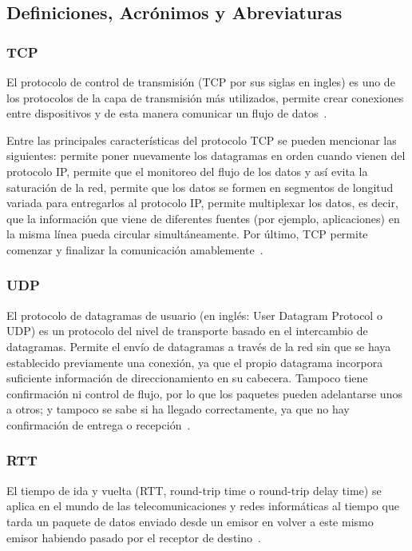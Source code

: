 \documentclass[11pt]{unc_so2}
\begin{document}
\subsection{Definiciones, Acrónimos y Abreviaturas}

\subsubsection{TCP}
El protocolo de control de transmisión (TCP por sus siglas en ingles) es uno de
los protocolos de la capa de transmisión más utilizados, permite crear
conexiones entre dispositivos y de esta manera comunicar un flujo de datos~\cite{tcp1}.

Entre las principales características del protocolo TCP se pueden mencionar las
siguientes: permite poner nuevamente los datagramas en orden cuando vienen del
protocolo IP, permite que el monitoreo del flujo de los datos y así evita la
saturación de la red, permite que los datos se formen en segmentos de longitud
variada para entregarlos al protocolo IP, permite multiplexar los datos, es
decir, que la información que viene de diferentes fuentes (por ejemplo,
aplicaciones) en la misma línea pueda circular simultáneamente. Por último, TCP
permite comenzar y finalizar la comunicación amablemente~\cite{tcp2}.

\subsubsection{UDP}
El protocolo de datagramas de usuario (en inglés: User Datagram Protocol o UDP)
es un protocolo del nivel de transporte basado en el intercambio de datagramas.
Permite el envío de datagramas a través de la red sin que se haya establecido
previamente una conexión, ya que el propio datagrama incorpora suficiente
información de direccionamiento en su cabecera. Tampoco tiene confirmación ni
control de flujo, por lo que los paquetes pueden adelantarse unos a otros; y
tampoco se sabe si ha llegado correctamente, ya que no hay confirmación de
entrega o recepción~\cite{udp}.

\subsubsection{RTT}
El tiempo de ida y vuelta (RTT, round-trip time o round-trip delay time) se
aplica en el mundo de las telecomunicaciones y redes informáticas al tiempo que
tarda un paquete de datos enviado desde un emisor en volver a este mismo emisor
habiendo pasado por el receptor de destino~\cite{rtt}.
\end{document}
